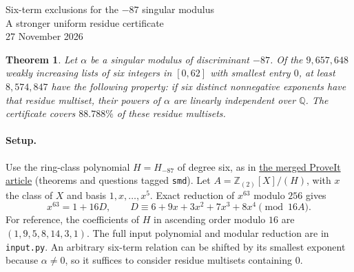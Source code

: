 \documentclass[11pt]{article}
\newtheorem{theorem}{Theorem}
\newcommand{\Z}{\mathbb Z}
\newcommand{\Q}{\mathbb Q}
\begin{document}
\begin{center}
{\LARGE Six-term exclusions for the $-87$ singular modulus}\\[5pt]
{\large A stronger uniform residue certificate}\\[6pt]
{\small 27 November 2026}
\end{center}
\begin{abstract}
For discriminant $-87$, the ProveIt article certifies linear independence
for $3{,}892{,}897$ of the $9{,}657{,}648$ anchored six-exponent residue
multisets modulo $63$. By retaining column-specific 2-adic precision
and testing the resulting lattice modulo $16$, we certify
$8{,}574{,}847$ multisets. Every lift in each certified multiset is covered.
The remaining $1{,}082{,}801$ multisets are not decided here.
\end{abstract}
\begin{theorem}
Let $\alpha$ be a singular modulus of discriminant $-87$. Of the
$9{,}657{,}648$ weakly increasing lists of six integers in $[0,62]$
with smallest entry $0$, at least $8{,}574{,}847$ have the following property:
if six distinct nonnegative exponents have that residue multiset,
their powers of $\alpha$ are linearly independent over $\Q$.
The certificate covers $88.788\%$ of these residue multisets.
\end{theorem}

\paragraph{Setup.}
Use the ring-class polynomial $H=H_{-87}$ of degree six, as in
\href{https://github.com/VladimirReshetnikov/ProveIt/blob/f6b5955e13bcefb2760480e7b823eba55ed2383e/Analysis/GeneralizedRiemannHypothesis/Article/sections/smd.tex}{the merged ProveIt article}
(theorems and questions tagged \texttt{smd}). Let
$A=\Z_{(2)}[X]/(H)$, with $x$ the class of $X$ and basis
$1,x,\ldots,x^5$. Exact reduction of $x^{63}$ modulo $256$ gives
\[
 x^{63}=1+16D,\qquad D\equiv6+9x+3x^2+7x^3+8x^4\pmod {16A}.
\]
For reference, the coefficients of $H$ in ascending order modulo
$16$ are $(1,9,5,8,14,3,1)$. The full input polynomial and
modular reduction are in \texttt{input.py}. An arbitrary six-term
relation can be shifted by its smallest exponent because $\alpha\ne0$,
so it suffices to consider residue multisets containing $0$.
\end{document}
